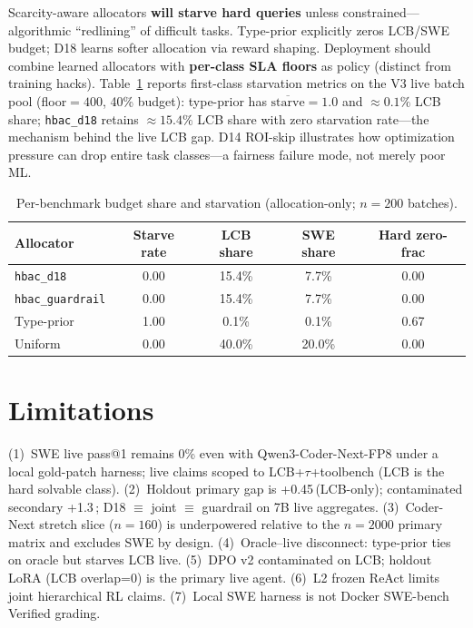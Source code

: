 \documentclass[11pt,letterpaper]{article}
\makeatletter
\newcommand{\passat}[1]{pass@#1}
\newcommand{\pp}{\,\text{pp}}
\makeatother
\begin{document}
Scarcity-aware allocators \textbf{will starve hard queries} unless constrained---algorithmic ``redlining'' of difficult tasks.
Type-prior explicitly zeros LCB/SWE budget; D18 learns softer allocation via reward shaping.
Deployment should combine learned allocators with \textbf{per-class SLA floors} as policy (distinct from training hacks).
Table~\ref{tab:budget-share} reports first-class starvation metrics on the V3 live batch pool (floor${=}400$, 40\% budget):
type-prior has $\overline{\mathrm{starve}}{=}1.0$ and ${\approx}0.1\%$ LCB share; \texttt{hbac\_d18} retains ${\approx}15.4\%$ LCB share with zero starvation rate---the mechanism behind the live LCB gap.
D14 ROI-skip illustrates how optimization pressure can drop entire task classes---a fairness failure mode, not merely poor ML.

\begin{table}[t]
\centering
\caption{Per-benchmark budget share and starvation (allocation-only; $n{=}200$ batches).}
\label{tab:budget-share}
\small
\begin{tabular}{lcccc}
\toprule
Allocator & Starve rate & LCB share & SWE share & Hard zero-frac \\
\midrule
\texttt{hbac\_d18} & 0.00 & 15.4\% & 7.7\% & 0.00 \\
\texttt{hbac\_guardrail} & 0.00 & 15.4\% & 7.7\% & 0.00 \\
Type-prior & 1.00 & 0.1\% & 0.1\% & 0.67 \\
Uniform & 0.00 & 40.0\% & 20.0\% & 0.00 \\
\bottomrule
\end{tabular}
\end{table}

\section{Limitations}
\label{sec:limits}

(1)~SWE live \passat{1} remains 0\% even with Qwen3-Coder-Next-FP8 under a local gold-patch harness; live claims scoped to LCB+$\tau$+toolbench (LCB is the hard solvable class).
(2)~Holdout primary gap is +0.45\pp (LCB-only); contaminated secondary +1.3\pp; D18 $\equiv$ joint $\equiv$ guardrail on 7B live aggregates.
(3)~Coder-Next stretch slice ($n{=}160$) is underpowered relative to the $n{=}2000$ primary matrix and excludes SWE by design.
(4)~Oracle--live disconnect: type-prior ties on oracle but starves LCB live.
(5)~DPO v2 contaminated on LCB; holdout LoRA (LCB overlap=0) is the primary live agent.
(6)~L2 frozen ReAct limits joint hierarchical RL claims.
(7)~Local SWE harness is not Docker SWE-bench Verified grading.
\end{document}
